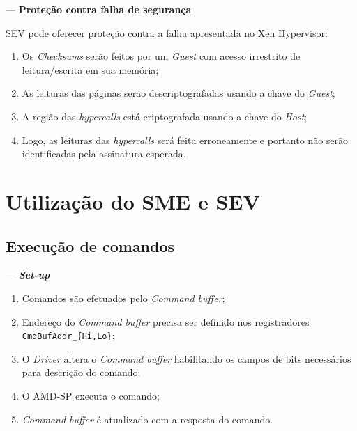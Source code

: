 \documentclass{beamer}
\newcommand{\innertitle}[1]{\textbf{\large {#1}}}
\newcommand{\autotitle}[1]{\secname{} --- \subsecname}
\begin{document}
\begin{frame}{\autotitle{}}
    \innertitle{Proteção contra falha de segurança}

    SEV pode oferecer proteção contra a falha apresentada no Xen Hypervisor:

    \begin{enumerate}
        \item Os \textit{Checksums} serão feitos por um \textit{Guest} com
            acesso irrestrito de leitura/escrita em sua memória;
        \item As leituras das páginas serão descriptografadas usando a chave do
            \textit{Guest};
        \item A região das \textit{hypercalls} está criptografada usando a
            chave do \textit{Host};
        \item Logo, as leituras das \textit{hypercalls} será feita erroneamente
            e portanto não serão identificadas pela assinatura esperada.
    \end{enumerate}
\end{frame}

\section{Utilização do SME e SEV}

\subsection{Execução de comandos}

\begin{frame}{\autotitle{}}
    \innertitle{\textit{Set-up}}

    \begin{enumerate}
        \item Comandos são efetuados pelo \textit{Command buffer};
        \item Endereço do \textit{Command buffer} precisa ser definido nos
            registradores \texttt{CmdBufAddr\_\{Hi,Lo\}};
        \item O \textit{Driver} altera o \textit{Command buffer} habilitando os
            campos de bits necessários para descrição do comando;
        \item O AMD-SP executa o comando;
        \item \textit{Command buffer} é atualizado com a resposta do comando.
    \end{enumerate}
\end{frame}
\end{document}
